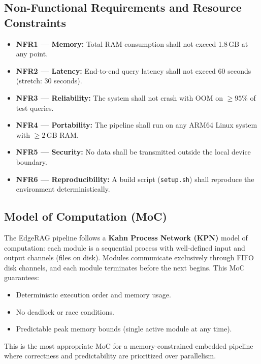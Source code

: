 \documentclass[10pt,twocolumn]{article}
\begin{document}
\subsection{Non-Functional Requirements and Resource Constraints}

\begin{itemize}[leftmargin=*,itemsep=2pt]
  \item \textbf{NFR1 — Memory:} Total RAM consumption shall not exceed 1.8\,GB at any point.
  \item \textbf{NFR2 — Latency:} End-to-end query latency shall not exceed 60 seconds (stretch: 30 seconds).
  \item \textbf{NFR3 — Reliability:} The system shall not crash with OOM on $\geq 95\%$ of test queries.
  \item \textbf{NFR4 — Portability:} The pipeline shall run on any ARM64 Linux system with $\geq 2$\,GB RAM.
  \item \textbf{NFR5 — Security:} No data shall be transmitted outside the local device boundary.
  \item \textbf{NFR6 — Reproducibility:} A build script (\texttt{setup.sh}) shall reproduce the environment deterministically.
\end{itemize}

\subsection{Model of Computation (MoC)}

The EdgeRAG pipeline follows a \textbf{Kahn Process Network (KPN)} model of computation: each module is a sequential process with well-defined input and output channels (files on disk). Modules communicate exclusively through FIFO disk channels, and each module terminates before the next begins. This MoC guarantees:

\begin{itemize}[leftmargin=*,itemsep=2pt]
  \item Deterministic execution order and memory usage.
  \item No deadlock or race conditions.
  \item Predictable peak memory bounds (single active module at any time).
\end{itemize}

This is the most appropriate MoC for a memory-constrained embedded pipeline where correctness and predictability are prioritized over parallelism.

\end{document}

